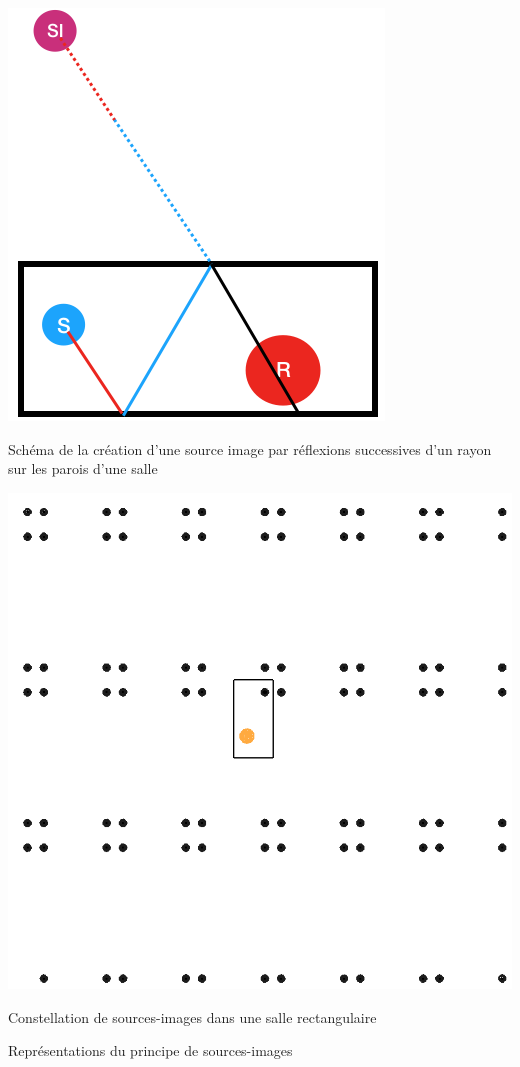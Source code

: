 \begin{figureth}
	\begin{subfigureth}{0.45\textwidth}
		\includegraphics[width=0.9\linewidth]{images/schema_SI}
		\caption{Schéma de la création d'une source image par réflexions successives d'un rayon sur les parois d'une salle}
		\label{schema_SI}
	\end{subfigureth}
	\qquad
	\begin{subfigureth}{0.45\textwidth}
		\includegraphics[width=\linewidth]{images/constellation}
		\caption{Constellation de sources-images dans une salle rectangulaire}
		\label{constellation}
	\end{subfigureth}
	\caption{Représentations du principe de sources-images}
\end{figureth}
